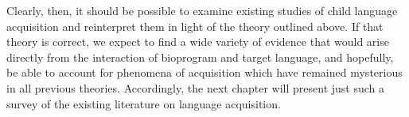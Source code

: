 Clearly, then, it should be possible to examine existing studies of child language acquisition and reinterpret them in light of the theory outlined above. If that theory is correct, we expect to find a wide variety of evidence that would arise directly from the interaction of bioprogram and target language, and hopefully, be able to account for phenomena of acquisition which have remained mysterious in all previous theories. Accordingly, the next chapter will present just such a survey of the existing literature on language acquisition.